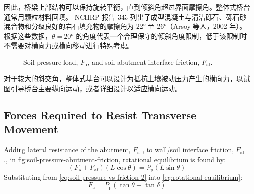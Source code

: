 因此，桥梁上部结构可以保持旋转平衡，直到倾斜角超过界面摩擦角。整体式桥台通常用颗粒材料回填。 NCHRP 报告 343 列出了成型混凝土与清洁砾石、砾石砂混合物和分级良好的岩石填充物的摩擦角为 \ang{22} 至 \ang{26}（Arsoy 等人，2002 年）。 根据这些数据，$\theta = \ang{20}$ 的角度代表一个合理保守的倾斜角度限制，低于该限制时不需要对横向力或横向移动进行特殊考虑。


\begin{figure}
  \caption{Soil pressure load, $P_\text{p}$, and soil abutment interface friction, $F_\text{af}$.}
  \label{fig:soil-pressure-abutment-friction}
\end{figure}

对于较大的斜交角，整体式基台可以设计为抵抗土壤被动压力产生的横向力，以试图引导桥台主要纵向运动，或者详细设计以适应横向运动。

\subsection{Forces Required to Resist Transverse Movement}
Adding lateral resistance of the abutment, $F_\text{a}$ , to wall/soil interface friction, $F_\text{af}$ ., in {fig:soil-pressure-abutment-friction}, rotational equilibrium is found by:
\begin{equation}
  \label{eq:rotational-equilibrium}
  (F_\text{a} + F_\text{af})(L \cos\theta)= P_\text{p} (L \sin\theta)
\end{equation}
Substituting from \cref{eq:soil-pressure-vs-friction-2} into \cref{eq:rotational-equilibrium}:
\begin{equation}
  F_\text{a} = P_\text{p} (\tan\theta - \tan\delta)
\end{equation}


